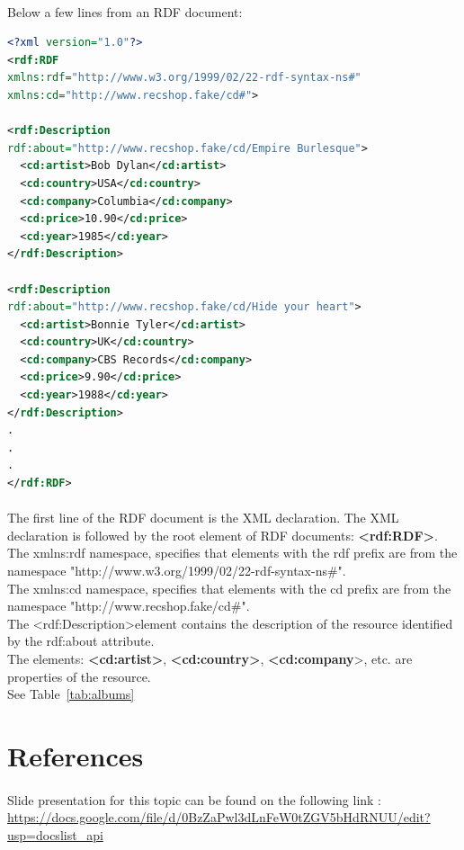 \documentclass[a4paper,11pt]{report}
\begin{document}
\paragraph{}
Below a few lines from an RDF document:

\begin{lstlisting}[language=XML]
<?xml version="1.0"?>
<rdf:RDF
xmlns:rdf="http://www.w3.org/1999/02/22-rdf-syntax-ns#"
xmlns:cd="http://www.recshop.fake/cd#">

<rdf:Description
rdf:about="http://www.recshop.fake/cd/Empire Burlesque">
  <cd:artist>Bob Dylan</cd:artist>
  <cd:country>USA</cd:country>
  <cd:company>Columbia</cd:company>
  <cd:price>10.90</cd:price>
  <cd:year>1985</cd:year>
</rdf:Description>

<rdf:Description
rdf:about="http://www.recshop.fake/cd/Hide your heart">
  <cd:artist>Bonnie Tyler</cd:artist>
  <cd:country>UK</cd:country>
  <cd:company>CBS Records</cd:company>
  <cd:price>9.90</cd:price>
  <cd:year>1988</cd:year>
</rdf:Description>
.
.
.
</rdf:RDF> 


\end{lstlisting}
\paragraph{}
The first line of the RDF document is the XML declaration. The XML declaration is followed by the root element of RDF documents: \textbf{\textless rdf:RDF\textgreater}.\\
The xmlns:rdf namespace, specifies that elements with the rdf prefix are from the namespace "http://www.w3.org/1999/02/22-rdf-syntax-ns\#".\\
The xmlns:cd namespace, specifies that elements with the cd prefix are from the namespace "http://www.recshop.fake/cd\#".\\
The \textless rdf:Description\textgreater element contains the description of the resource identified by the rdf:about attribute.\\
The elements: \textbf{\textless cd:artist\textgreater}, \textbf{\textless cd:country\textgreater}, \textbf{\textless cd:company}\textgreater, etc. are properties of the resource.\\
See Table~\ref{tab:albums}

\section{References}
\paragraph{}
Slide presentation for this topic can be found on the following link : \url{https://docs.google.com/file/d/0BzZaPwl3dLnFeW0tZGV5bHdRNUU/edit?usp=docslist_api} \cite{w3crdf,rdfrules,wikirdf,semantic,video1}
\end{document}
